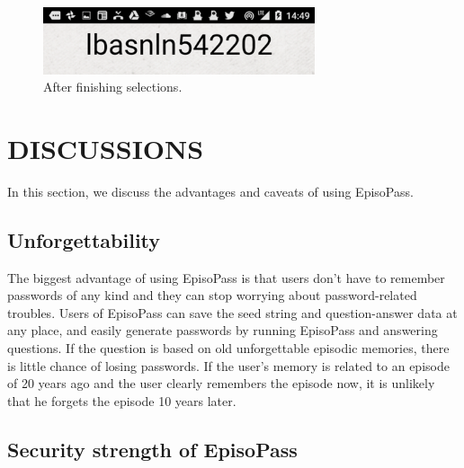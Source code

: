 \documentclass{article}
\begin{document}
\begin{figure}[H]
\includegraphics[width=80mm,bb=-30 0 400 106]{figures/ba8f5aeaa935ad63437969f4d746746b.png}
\caption{After finishing selections.}
\label{android2}
\end{figure}




\section{DISCUSSIONS}

In this section, we discuss the advantages and caveats of
using EpisoPass.

\subsection{Unforgettability}

The biggest advantage of using EpisoPass is that
users don't have to remember passwords of any kind and
they can stop worrying about password-related troubles.
%
Users of EpisoPass can save the seed string and question-answer data
at any place, and easily generate passwords by running
EpisoPass and answering questions.
If the question is based on old unforgettable episodic memories,
there is little chance of losing passwords.
If the user's memory is related to an episode of 20 years ago and the user clearly
remembers the episode now, it is unlikely that he forgets the episode 10 years later.

\subsection{Security strength of EpisoPass}
\end{document}
